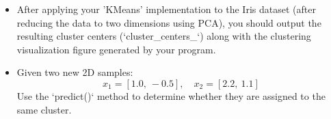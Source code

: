 \documentclass[10pt]{article}
\begin{document}
\begin{enumerate}
\begin{itemize}
	\item[(b)] After applying your 'KMeans' implementation to the Iris dataset (after reducing the data to two dimensions using PCA), you should output the resulting cluster centers (`cluster\_centers\_`) along with the clustering visualization figure generated by your program. 

    \item[(c)] Given two new 2D samples:
    $$ 
    x_1 = [1.0,\ -0.5], \quad x_2 = [2.2,\ 1.1]  
    $$
    Use the `predict()` method to determine whether they are assigned to the same cluster. 
\end{itemize}




\newpage



\end{enumerate}
\end{document}
